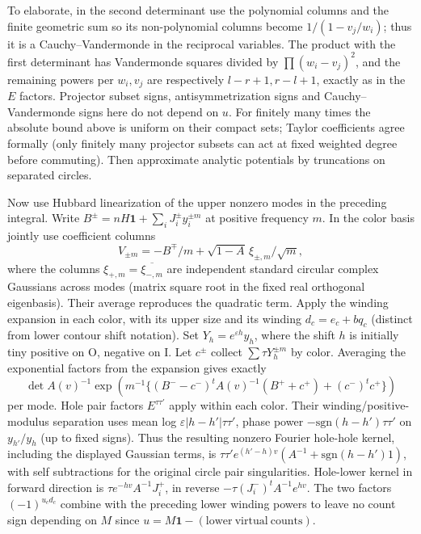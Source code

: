 To elaborate, in the second determinant use the polynomial columns and the finite geometric sum so its non-polynomial columns become \(1/(1-v_j/w_i)\); thus it is a Cauchy--Vandermonde in the reciprocal variables. The product with the first determinant has Vandermonde squares divided by \(\prod(w_i-v_j)^2\), and the remaining powers per \(w_i,v_j\) are respectively \(l-r+1,r-l+1\), exactly as in the \(E\) factors. Projector subset signs, antisymmetrization signs and Cauchy--Vandermonde signs here do not depend on \(u\). For finitely many times the absolute bound above is uniform on their compact sets; Taylor coefficients agree formally (only finitely many projector subsets can act at fixed weighted degree before commuting). Then approximate analytic potentials by truncations on separated circles.

Now use Hubbard linearization of the upper nonzero modes in the preceding integral. Write \(B^\pm=nH\mathbf1+\sum_i J_i^\pm y_i^{\pm m}\) at positive frequency \(m\). In the color basis jointly use coefficient columns
\[
 V_{\pm m}=-B^\mp/m+\sqrt{1-A}\,\xi_{\pm,m}/\sqrt m ,
\]
where the columns \(\xi_{+,m}=\overline{\xi_{-,m}}\) are independent standard circular complex Gaussians across modes (matrix square root in the fixed real orthogonal eigenbasis). Their average reproduces the quadratic term. Apply the winding expansion in each color, with its upper size and its winding \(d_c=e_c+b q_c\) (distinct from lower contour shift notation). Set \(Y_h=e^{\varepsilon h}y_h\), where the shift \(h\) is initially tiny positive on O, negative on I. Let \(c^\pm\) collect \(\sum \tau Y_h^{\pm m}\) by color. Averaging the exponential factors from the expansion gives exactly
\[
 \det A(v)^{-1}\exp\left( m^{-1}
 \{(B^--c^-)^t A(v)^{-1}(B^++c^+)+ (c^-)^t c^+\}\right)
\]
per mode. Hole pair factors \(E^{\tau\tau'}\) apply within each color. Their winding/positive-modulus separation uses mean log \(\varepsilon|h-h'|\tau\tau'\), phase power \(-\mathrm{sgn}(h-h')\tau\tau'\) on \(y_{h'}/y_h\) (up to fixed signs). Thus the resulting nonzero Fourier hole-hole kernel, including the displayed Gaussian terms, is \(\tau\tau'e^{(h'-h)v}(A^{-1}+\mathrm{sgn}(h-h')1)\), with self subtractions for the original circle pair singularities. Hole-lower kernel in forward direction is \(\tau e^{-hv} A^{-1}J_i^+\), in reverse \(-\tau (J_i^-)^t A^{-1} e^{hv}\). The two factors \((-1)^{u_cd_c}\) combine with the preceding lower winding powers to leave no count sign depending on \(M\) since \(u=M\mathbf1-\mathrm{(lower\ virtual\ counts)}\).


